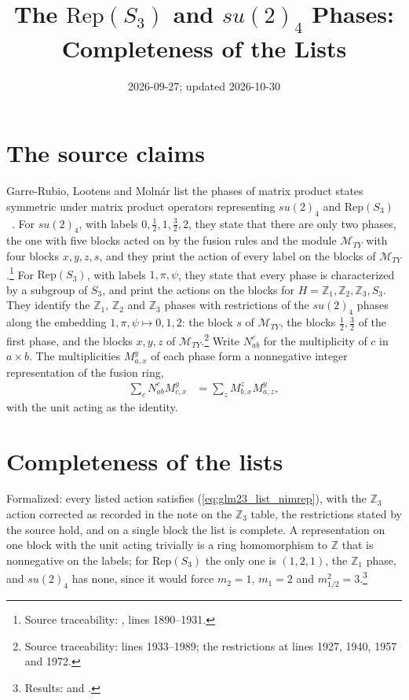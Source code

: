 \documentclass{article}
\title{The $\mathrm{Rep}(S_3)$ and $su(2)_4$ Phases: Completeness of the Lists}
\author{}
\date{2026-09-27; updated 2026-10-30}
\begin{document}
\maketitle
{}

\section{The source claims}
Garre-Rubio, Lootens and Moln\'ar list the phases of matrix product states
symmetric under matrix product operators representing $su(2)_4$ and
$\mathrm{Rep}(S_3)$~\cite{GarreRubio2023MPOSym}. For $su(2)_4$, with labels
$0,\tfrac12,1,\tfrac32,2$, they state that there are only two phases, the one
with five blocks acted on by the fusion rules and the module
$\mathcal M_{TY}$ with four blocks $x,y,z,s$, and they print the action of
every label on the blocks of $\mathcal M_{TY}$.\footnote{Source traceability:
    , lines 1890--1931.} For
$\mathrm{Rep}(S_3)$, with labels $1,\pi,\psi$, they state that every phase
is characterized by a subgroup of $S_3$, and print the actions on the blocks
for $H=\mathbb Z_1,\mathbb Z_2,\mathbb Z_3,S_3$. They identify the
$\mathbb Z_1$, $\mathbb Z_2$ and $\mathbb Z_3$ phases with restrictions of
the $su(2)_4$ phases along the embedding $1,\pi,\psi\mapsto0,1,2$: the block
$s$ of $\mathcal M_{TY}$, the blocks $\tfrac12,\tfrac32$ of the first phase,
and the blocks $x,y,z$ of $\mathcal M_{TY}$.\footnote{Source traceability:
    lines 1933--1989; the restrictions at lines 1927, 1940, 1957 and 1972.}
Write $N_{ab}^c$ for the multiplicity of $c$ in $a\times b$. The
multiplicities $M_{a,x}^y$ of each phase form a nonnegative integer
representation of the fusion ring,
\begin{align}
    \sum_c N_{ab}^c M_{c,x}^y & =\sum_z M_{b,x}^z M_{a,z}^y ,
    \label{eq:glm23_list_nimrep}
\end{align}
with the unit acting as the identity.

\section{Completeness of the lists}
Formalized: every listed action satisfies (\ref{eq:glm23_list_nimrep}), with the $\mathbb Z_3$ action
corrected as recorded in the note on the $\mathbb Z_3$ table, the restrictions
stated by the source hold, and on a single block the list is complete. A representation on one
block with the unit acting trivially is a ring homomorphism to $\mathbb Z$
that is nonnegative on the labels; for $\mathrm{Rep}(S_3)$ the only one is
$(1,2,1)$, the $\mathbb Z_1$ phase, and $su(2)_4$ has none, since it would force
$m_2=1$, $m_1=2$ and $m_{1/2}^2=3$.\footnote{Results:
     and
    .}
\end{document}
